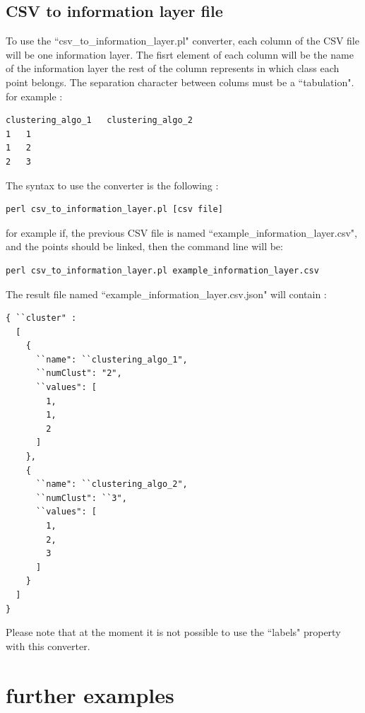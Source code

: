 \documentclass{bioinfo}
\begin{document}
\subsection{CSV to information layer file}
To use the ``csv\_to\_information\_layer.pl" converter, each column of the CSV file will be one information layer. The fisrt element of each column will be the name of the information layer the rest of the column represents in which class each point belongs. The separation character between colums must be a ``tabulation". for example :
\begin{lstlisting}
clustering_algo_1	clustering_algo_2
1	1
1	2
2	3
\end{lstlisting}
The syntax to use the converter is the following :
\begin{lstlisting}
perl csv_to_information_layer.pl [csv file]
\end{lstlisting}
for example if, the previous CSV file is named ``example\_information\_layer.csv", and the points should be linked, then the command line will be:
\begin{lstlisting}
perl csv_to_information_layer.pl example_information_layer.csv
\end{lstlisting}
The result file named ``example\_information\_layer.csv.json" will contain :
\begin{lstlisting}
{ ``cluster" :
  [
    {
      ``name": ``clustering_algo_1",
      ``numClust": "2",
      ``values": [
        1,
        1,
        2
      ]
    },
    {
      ``name": ``clustering_algo_2",
      ``numClust": ``3",
      ``values": [
        1,
        2,
        3
      ]
    }
  ]
}
\end{lstlisting}
Please note that at the moment it is not possible to use the ``labels" property with this converter. 
\section{further examples}
\end{document}
